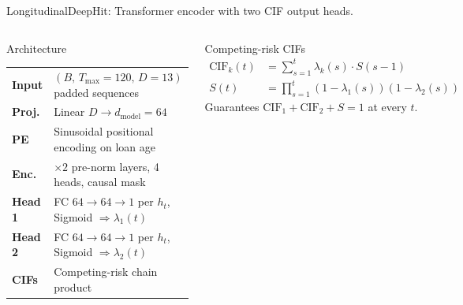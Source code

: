 \documentclass[10pt,aspectratio=169]{beamer}
\begin{document}
\begin{frame}{LongitudinalDeepHit: Transformer encoder with two CIF output heads.}
    \begin{columns}[T,onlytextwidth]
        \begin{block}{Architecture}
        \small
        \begin{tabular}{@{}ll@{}}
            \textbf{Input}  & $(B,\, T_{\max}{=}120,\, D{=}13)$ padded sequences \\
            \textbf{Proj.}  & Linear $D \to d_{\text{model}}{=}64$ \\
            \textbf{PE}     & Sinusoidal positional encoding on loan age \\
            \textbf{Enc.}   & $\times 2$ pre-norm layers, 4 heads, causal mask \\
            \textbf{Head 1} & FC $64\!\to\!64\!\to\!1$ per $h_t$, Sigmoid $\Rightarrow \lambda_1(t)$ \\
            \textbf{Head 2} & FC $64\!\to\!64\!\to\!1$ per $h_t$, Sigmoid $\Rightarrow \lambda_2(t)$ \\
            \textbf{CIFs}   & Competing-risk chain product \\
        \end{tabular}
        \end{block}

        \vspace{0.1em}
        \begin{block}{Competing-risk CIFs}
        \footnotesize
        \vspace{-0.9em}
        \begin{align*}
            \text{CIF}_k(t) &= \textstyle\sum_{s=1}^{t} \lambda_k(s)\cdot S(s-1) \\[-3pt]
            S(t) &= \textstyle\prod_{s=1}^{t}(1-\lambda_1(s))(1-\lambda_2(s))
        \end{align*}
        \vspace{-0.9em}
        Guarantees $\text{CIF}_1 + \text{CIF}_2 + S = 1$ at every $t$.
        \end{block}


\end{columns}
\end{frame}
\end{document}
